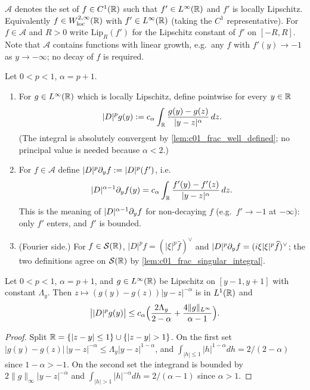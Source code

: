 \begin{definition}
  \label{def:c01_admissible_class}
  $\mathcal A$ denotes the set of $f\in C^1(\mathbb{R})$ such that $f'\in L^\infty(\mathbb{R})$ and $f'$ is
  locally Lipschitz.  Equivalently $f\in W^{2,\infty}_{\mathrm{loc}}(\mathbb{R})$ with
  $f'\in L^\infty(\mathbb{R})$ (taking the $C^1$ representative).  For $f\in\mathcal A$ and $R>0$
  write $\mathrm{Lip}_R(f')$ for the Lipschitz constant of $f'$ on $[-R,R]$.
  Note that $\mathcal A$ contains functions with linear growth, e.g.\ any $f$ with
  $f'(y)\to-1$ as $y\to-\infty$; no decay of $f$ is required.
\end{definition}

\begin{definition}
  \label{def:frac_multiplier}
  Let $0<p<1$, $\alpha=p+1$.
  \begin{enumerate}
    \item For $g\in L^\infty(\mathbb{R})$ which is locally Lipschitz, define pointwise for every
      $y\in\mathbb{R}$
      \[
        |D|^{p}g(y):=c_\alpha\int_{\mathbb{R}}\frac{g(y)-g(z)}{|y-z|^{\alpha}}\,dz .
      \]
      (The integral is absolutely convergent by \cref{lem:c01_frac_well_defined}; no
      principal value is needed because $\alpha<2$.)
    \item For $f\in\mathcal A$ define $|D|^{p}\partial_y f:=|D|^p(f')$, i.e.
      \[
        |D|^{\alpha-1}\partial_y f(y)=c_\alpha\int_{\mathbb{R}}\frac{f'(y)-f'(z)}{|y-z|^{\alpha}}\,dz .
      \]
      This is the meaning of $|D|^{\alpha-1}\partial_y f$ for non-decaying $f$ (e.g.\ $f'\to-1$ at
      $-\infty$): only $f'$ enters, and $f'$ is bounded.
    \item (Fourier side.) For $f\in\mathcal S(\mathbb{R})$, $|D|^p f=(|\xi|^{p}\widehat f)^\vee$ and
      $|D|^{p}\partial_y f=(i\xi|\xi|^{p}\widehat f)^\vee$; the two definitions agree on
      $\mathcal S(\mathbb{R})$ by \cref{lem:c01_frac_singular_integral}.
  \end{enumerate}
\end{definition}

\begin{lemma}
  \label{lem:c01_frac_well_defined}
  Let $0<p<1$, $\alpha=p+1$, and $g\in L^\infty(\mathbb{R})$ be Lipschitz on $[y-1,y+1]$ with constant
  $\Lambda_y$.  Then $z\mapsto (g(y)-g(z))|y-z|^{-\alpha}$ is in $L^1(\mathbb{R})$ and
  \[
    \bigl||D|^pg(y)\bigr|\le c_\alpha\Bigl(\frac{2\Lambda_y}{2-\alpha}
      +\frac{4\|g\|_{L^\infty}}{\alpha-1}\Bigr).
  \]
\end{lemma}
\begin{proof}
  Split $\R=\{|z-y|\le1\}\cup\{|z-y|>1\}$.  On the first set
  $|g(y)-g(z)|\,|y-z|^{-\alpha}\le\Lambda_y|y-z|^{1-\alpha}$, and
  $\int_{|h|\le1}|h|^{1-\alpha}dh=2/(2-\alpha)$ since $1-\alpha>-1$.  On the second set the
  integrand is bounded by $2\|g\|_\infty|y-z|^{-\alpha}$ and
  $\int_{|h|>1}|h|^{-\alpha}dh=2/(\alpha-1)$ since $\alpha>1$.
\end{proof}

